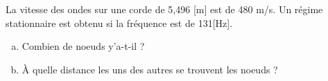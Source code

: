 %
%
    La vitesse des ondes sur une corde de 5,496 [m] est de 480 m/s. Un régime stationnaire est obtenu si la fréquence est de 131[Hz].
    \begin{enumerate}[a)]
        \item Combien de noeuds y'a-t-il ?
        \item À quelle distance les uns des autres se trouvent les noeuds ?
    \end{enumerate}
